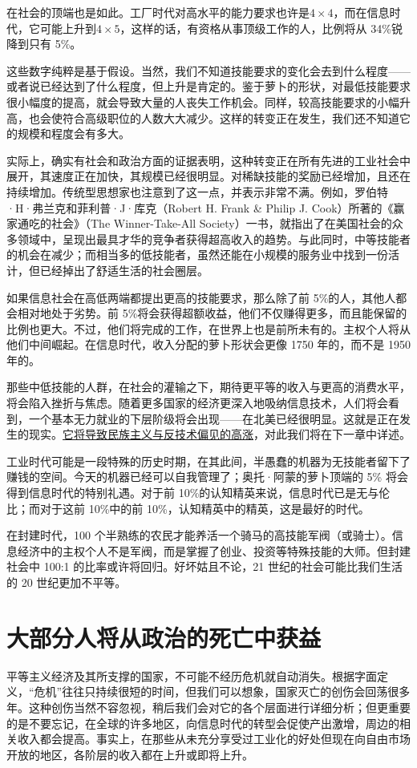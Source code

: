 在社会的顶端也是如此。工厂时代对高水平的能力要求也许是$ 4 \times 4 $，而在信息时代，它可能上升到$ 4 \times 5 $，这样的话，有资格从事顶级工作的人，比例将从 34\%锐降到只有 5\%。

这些数字纯粹是基于假设。当然，我们不知道技能要求的变化会去到什么程度——或者说已经达到了什么程度，但上升是肯定的。鉴于萝卜的形状，对最低技能要求很小幅度的提高，就会导致大量的人丧失工作机会。同样，较高技能要求的小幅升高，也会使符合高级职位的人数大大减少。这样的转变正在发生，我们还不知道它的规模和程度会有多大。

实际上，确实有社会和政治方面的证据表明，这种转变正在所有先进的工业社会中展开，其速度正在加快，其规模已经很明显。对稀缺技能的奖励已经增加，且还在持续增加。传统型思想家也注意到了这一点，并表示非常不满。例如，罗伯特·H·弗兰克和菲利普·J·库克（Robert H. Frank \& Philip J. Cook）所著的《赢家通吃的社会》（The Winner-Take-All Society）一书，就指出了在美国社会的众多领域中，呈现出最具才华的竞争者获得超高收入的趋势。与此同时，中等技能者的机会在减少；而相当多的低技能者，虽然还能在小规模的服务业中找到一份活计，但已经掉出了舒适生活的社会圈层。

如果信息社会在高低两端都提出更高的技能要求，那么除了前 5\%的人，其他人都会相对地处于劣势。前 5\%将会获得超额收益，他们不仅赚得更多，而且能保留的比例也更大。不过，他们将完成的工作，在世界上也是前所未有的。主权个人将从他们中间崛起。在信息时代，收入分配的萝卜形状会更像 1750 年的，而不是 1950 年的。

那些中低技能的人群，在社会的灌输之下，期待更平等的收入与更高的消费水平，将会陷入挫折与焦虑。随着更多国家的经济更深入地吸纳信息技术，人们将会看到，一个基本无力就业的下层阶级将会出现——在北美已经很明显。这就是正在发生的现实。\uline{它将导致民族主义与反技术偏见的高涨}，对此我们将在下一章中详述。

工业时代可能是一段特殊的历史时期，在其此间，半愚蠢的机器为无技能者留下了赚钱的空间。今天的机器已经可以自我管理了；奥托·阿蒙的萝卜顶端的 5\% 将会得到信息时代的特别礼遇。对于前 10\%的认知精英来说，信息时代已是无与伦比；而对于这前 10\%中的前 10\%，认知精英中的精英，这是最好的时代。

在封建时代，100 个半熟练的农民才能养活一个骑马的高技能军阀（或骑士）。信息经济中的主权个人不是军阀，而是掌握了创业、投资等特殊技能的大师。但封建社会中 100:1 的比率或许将回归。好坏姑且不论，21 世纪的社会可能比我们生活的 20 世纪更加不平等。

\section{大部分人将从政治的死亡中获益}
平等主义经济及其所支撑的国家，不可能不经历危机就自动消失。根据字面定义，“危机”往往只持续很短的时间，但我们可以想象，国家灭亡的创伤会回荡很多年。这种创伤当然不容忽视，稍后我们会对它的各个层面进行详细分析；但更重要的是不要忘记，在全球的许多地区，向信息时代的转型会促使产出激增，周边的相关收入都会提高。事实上，在那些从未充分享受过工业化的好处但现在向自由市场开放的地区，各阶层的收入都在上升或即将上升。

